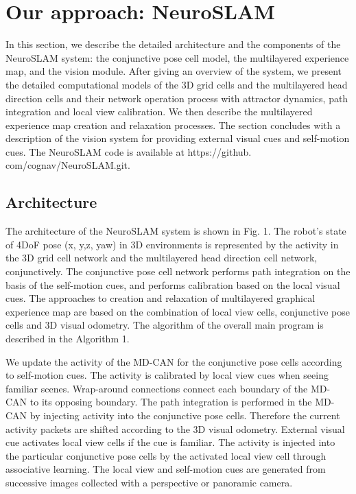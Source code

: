 \section{Our approach: NeuroSLAM}

In this section, we describe the detailed architecture and the components of the NeuroSLAM system: the conjunctive pose cell model, the multilayered experience map, and the vision module. 
After giving an overview of the system, we present the detailed computational models of the 3D grid cells and the multilayered head direction cells and their network operation process with attractor dynamics, path integration and local view calibration. 
We then describe the multilayered experience map creation and relaxation processes. 
The section concludes with a description of the vision system for providing external visual cues and self-motion cues. 
The NeuroSLAM code is available at https://github. com/cognav/NeuroSLAM.git.


\subsection{Architecture}

The architecture of the NeuroSLAM system is shown in Fig. 1. 
The robot's state of 4DoF pose (x, y,z, yaw) in 3D environments is represented by the activity in the 3D grid cell network and the multilayered head direction cell network, conjunctively. 
The conjunctive pose cell network performs path integration on the basis of the self-motion cues, and performs calibration based on the local visual cues. 
The approaches to creation and relaxation of multilayered graphical experience map are based on the combination of local view cells, conjunctive pose cells and 3D visual odometry. 
The algorithm of the overall main program is described in the Algorithm 1.


We update the activity of the MD-CAN for the conjunctive pose cells according to self-motion cues. 
The activity is calibrated by local view cues when seeing familiar scenes. 
Wrap-around connections connect each boundary of the MD-CAN to its opposing boundary. 
The path integration is performed in the MD-CAN by injecting activity into the conjunctive pose cells. 
Therefore the current activity packets are shifted according to the 3D visual odometry. 
External visual cue activates local view cells if the cue is familiar. 
The activity is injected into the particular conjunctive pose cells by the activated local view cell through associative learning. 
The local view and self-motion cues are generated from successive images collected with a perspective or panoramic camera.


